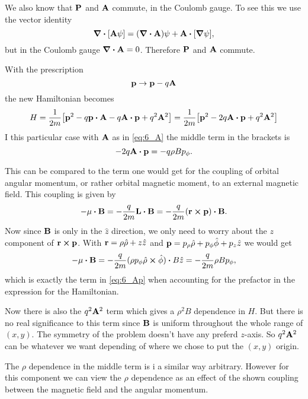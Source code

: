 \documentclass[11pt,letter, swedish, english
]{article}
\begin{document}
We also know that $\vb{P}$ and $\vb{A}$ commute, in the Coulomb
gauge. To see this we use the vector identity
\begin{equation}
\div[\vb{A}\psi]=(\div\vb{A})\psi + \vb{A}\vdot[\grad\psi],
\end{equation}
but in the Coulomb gauge $\div\vb{A}=0$. Therefore $\vb{P}$ and
$\vb{A}$ commute. 

With the prescription
\begin{equation}
\vb{p}\to \vb{p}-q\vb{A}
\end{equation}
the new Hamiltonian becomes
\begin{equation}
H=\frac{1}{2m}\qty[\vb{p}^2-q\vb{p}\vdot\vb{A}-q\vb{A}\vdot\vb{p}+q^2\vb{A}^2]
=\frac{1}{2m}\qty[\vb{p}^2-2q\vb{A}\vdot\vb{p}+q^2\vb{A}^2]
\end{equation}
I this particular case with $\vb{A}$ as in \eqref{eq:6_A} the middle
term in the brackets is
\begin{equation}
-2q\vb{A}\vdot\vb{p}=-q\rho B p_\phi.
\end{equation}

This can be compared to the term one would get for the coupling
of orbital angular momentum, or rather orbital magnetic moment,
to an external magnetic field. This coupling is given by
\begin{equation}\label{eq:6_Ap}
-\vb{\mu}\vdot\vb{B}=-\frac{q}{2m}\vb{L}\vdot\vb{B}
=-\frac{q}{2m}(\vb{r}\cross\vb{p})\vdot\vb{B}.
\end{equation}
Now since $\vb{B}$ is only in the $\hat{z}$ direction, we
only need to worry about the $z$ component of
$\vb{r}\cross\vb{p}$. With $\vb{r}=\rho\hat\rho+z\hat{z}$ and
$\vb{p}=p_\rho\hat\rho + p_\phi\hat\phi+p_z\hat{z}$ we would get
\begin{equation}
-\vb{\mu}\vdot\vb{B}
=-\frac{q}{2m}(\rho p_\phi \hat\rho\cross\hat\phi)\vdot B\hat{z}
=-\frac{q}{2m}\rho B p_\phi,
\end{equation}
which is exactly the term in \eqref{eq:6_Ap} when accounting for the
prefactor in the expression for the Hamiltonian.

Now there is also the $q^2\vb{A}^2$ term which gives a $\rho^2B$
dependence in $H$. But there is no real significance to this term
since $\vb{B}$ is uniform throughout the whole range of $(x, y)$. The
symmetry of the problem doesn't have any preferd $z$-axis. So
$q^2\vb{A}^2$ can be whatever we want depending of where we chose to
put the $(x, y)$ origin. 

The $\rho$ dependence in the middle term is i a similar way
arbitrary. However for this component we can view the $\rho$
dependence as an effect of the shown coupling between the magnetic
field and the angular momentum.
\end{document}
